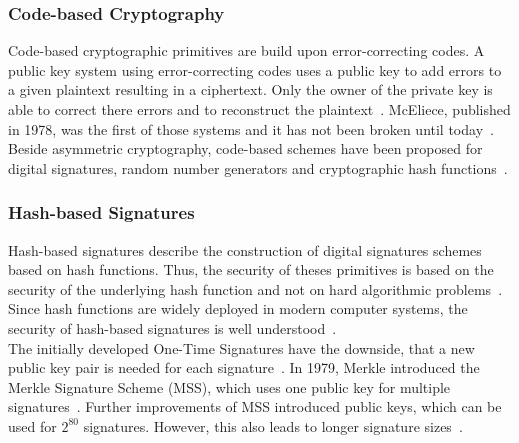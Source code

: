 \subsubsection{Code-based Cryptography}
Code-based cryptographic primitives are build upon error-correcting codes. A public key system using error-correcting codes uses a public key to add errors to a given plaintext resulting in a ciphertext. Only the owner of the private key is able to correct there errors and to reconstruct the plaintext~\parencite{bernstein2017post}. McEliece, published in 1978, was the first of those systems and it has not been broken until today~\parencite{mceliece1978public}.
Beside asymmetric cryptography, code-based schemes have been proposed for digital signatures, random number generators and cryptographic hash functions~\parencite{bernstein2017post}.
\subsubsection{Hash-based Signatures}
Hash-based signatures describe the construction of digital signatures schemes based on hash functions. Thus, the security of theses primitives is based on the security of the underlying hash function and not on hard algorithmic problems~\parencite{bernstein2017post}. Since hash functions are widely deployed in modern computer systems, the security of hash-based signatures is well understood~\parencite{chen2016report}.\\
The initially developed One-Time Signatures have the downside, that a new public key pair is needed for each signature~\parencite{becker2008merkle}. In 1979, Merkle introduced the Merkle Signature Scheme (MSS), which uses one public key for multiple signatures~\parencite{merkle1979secrecy}. Further improvements of MSS introduced public keys, which can be used for $2^{80}$ signatures. However, this also leads to longer signature sizes~\parencite{becker2008merkle}.

